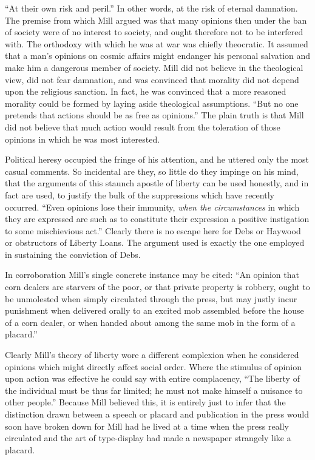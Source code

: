 \documentclass[openany,nobib,twoside,nohyper]{tufte-book}
\begin{document}
``At their own risk and peril.'' In other words, at the risk of eternal
damnation. The premise from which Mill argued was that many opinions
then under the ban of society were of no interest to society, and ought
therefore not to be interfered with. The orthodoxy with which he was at
war was chiefly theocratic. It assumed that a man's opinions on cosmic
affairs might endanger his personal salvation and make him a dangerous
member of society. Mill did not believe in the theological view, did not
fear damnation, and was convinced that morality did not depend upon the
religious sanction. In fact, he was convinced that a more reasoned
morality could be formed by laying aside theological assumptions. ``But
no one pretends that actions should be as free as opinions.'' The plain
truth is that Mill did not believe that much action would result from
the toleration of those opinions in which he was most interested.

Political heresy occupied the fringe of his attention, and he uttered
only the most casual comments. So incidental are they, so little do they
impinge on his mind, that the arguments of this staunch apostle of
liberty can be used honestly, and in fact are used, to justify the bulk
of the suppressions which have recently occurred. ``Even opinions lose
their immunity, \emph{when the circumstances} in which they are
expressed are such as to constitute their expression a positive
instigation to some mischievious act.'' Clearly there is no escape here
for Debs or Haywood or obstructors of Liberty Loans. The argument used
is exactly the one employed in sustaining the conviction of Debs.

In corroboration Mill's single concrete instance may be cited: ``An
opinion that corn dealers are starvers of the poor, or that private
property is robbery, ought to be unmolested when simply circulated
through the press, but may justly incur punishment when delivered orally
to an excited mob assembled before the house of a corn dealer, or when
handed about among the same mob in the form of a placard.''

Clearly Mill's theory of liberty wore a different complexion when he
considered opinions which might directly affect social order. Where the
stimulus of opinion upon action was effective he could say with entire
complacency, ``The liberty of the individual must be thus far limited;
he must not make himself a nuisance to other people.'' Because Mill
believed this, it is entirely just to infer that the distinction drawn
between a speech or placard and publication in the press would soon have
broken down for Mill had he lived at a time when the press really
circulated and the art of type-display had made a newspaper strangely
like a placard.
\end{document}

